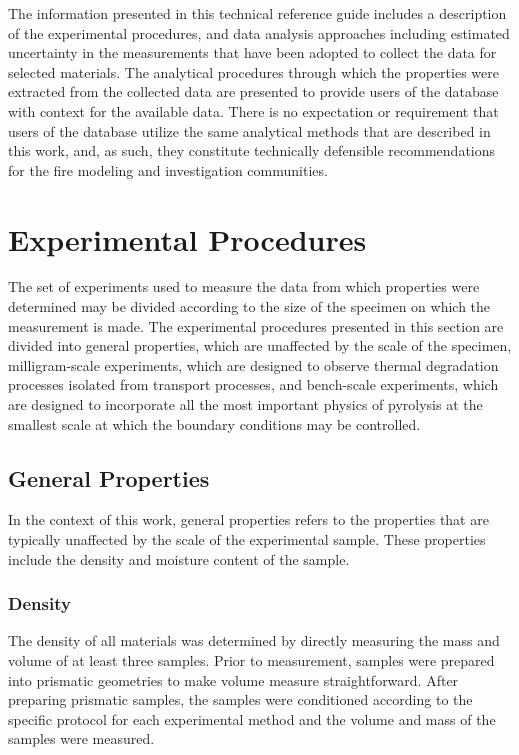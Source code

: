\documentclass[12pt,oneside]{book}
\begin{document}
The information presented in this technical reference guide includes a description of the experimental procedures, and data analysis approaches including estimated uncertainty in the measurements that have been adopted to collect the data for selected materials. The analytical procedures through which the properties were extracted from the collected data are presented to provide users of the database with context for the available data. There is no expectation or requirement that users of the database utilize the same analytical methods that are described in this work, and, as such, they constitute technically defensible recommendations for the fire modeling and investigation communities.

\chapter{Experimental Procedures}
\label{sec:experimental}

The set of experiments used to measure the data from which properties were determined may be divided according to the size of the specimen on which the measurement is made. The experimental procedures presented in this section are divided into general properties, which are unaffected by the scale of the specimen, milligram-scale experiments, which are designed to observe thermal degradation processes isolated from transport processes, and bench-scale experiments, which are designed to incorporate all the most important physics of pyrolysis at the smallest scale at which the boundary conditions may be controlled.

\section{General Properties}
\label{sec:general_properties}

In the context of this work, general properties refers to the properties that are typically unaffected by the scale of the experimental sample. These properties include the density and moisture content of the sample.

\subsection{Density}
\label{sec:density}

The density of all materials was determined by directly measuring the mass and volume of at least three samples. Prior to measurement, samples were prepared into prismatic geometries to make volume measure straightforward. After preparing prismatic samples, the samples were conditioned according to the specific protocol for each experimental method and the volume and mass of the samples were measured.  
\end{document}
